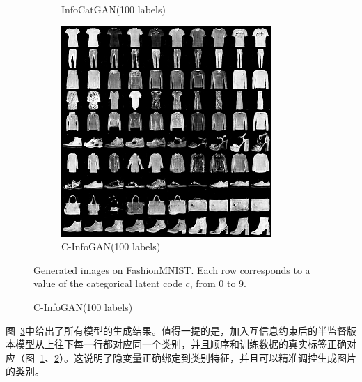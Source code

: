 \begin{figure}[htbp]
\begin{subfigure}[b]{\trif\textwidth}
    \caption{InfoCatGAN(100 labels)}
    \label{ffig:ss-icg}
  \end{subfigure}
  \begin{subfigure}[b]{\trif\textwidth}
    \includegraphics[width=\textwidth]{Img/fa-ig-100labels.png}
    \caption{C-InfoGAN(100 labels)}
    \label{ffig:ss-ig}
  \end{subfigure}

  {Generated images on FashionMNIST. Each row corresponds to a value of the categorical latent code $c$, from 0 to 9.}
  \label{fig:fashion}
\end{figure}

图~\ref{fig:fashion}中给出了所有模型的生成结果。值得一提的是，加入互信息约束后的半监督版本模型从上往下每一行都对应同一个类别，并且顺序和训练数据的真实标签正确对应（图~\ref{ffig:ss-icg}、\ref{ffig:ss-ig}）。这说明了隐变量正确绑定到类别特征，并且可以精准调控生成图片的类别。

